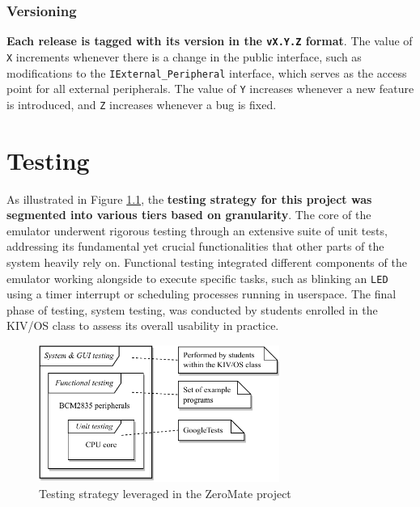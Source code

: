 \documentclass[english, ing, kiv, he, iso690numb, pdf]{fasthesis}
\begin{document}
	\subsection{Versioning}
	
	\textbf{Each release is tagged with its version in the \texttt{v{X}.{Y}.{Z}} format}. The value of \texttt{{X}} increments whenever there is a change in the public interface, such as modifications to the \texttt{IExternal\_Peripheral} interface, which serves as the access point for all external peripherals. The value of \texttt{{Y}} increases whenever a new feature is introduced, and \texttt{{Z}} increases whenever a bug is fixed.
	
	\chapter{Testing}
	
	As illustrated in Figure \ref{Testing strategy leveraged in the ZeroMate project}, the \textbf{testing strategy for this project was segmented into various tiers based on granularity}. The core of the emulator underwent rigorous testing through an extensive suite of unit tests, addressing its fundamental yet crucial functionalities that other parts of the system heavily rely on. Functional testing integrated different components of the emulator working alongside to execute specific tasks, such as blinking an \texttt{LED} using a timer interrupt or scheduling processes running in userspace. The final phase of testing, system testing, was conducted by students enrolled in the KIV/OS class to assess its overall usability in practice.
	
	\begin{figure}[ht]
		\centering
		\includegraphics[width=0.7\textwidth]{img/diagrams/testing.pdf}
		\caption{Testing strategy leveraged in the ZeroMate project}
		\label{Testing strategy leveraged in the ZeroMate project}
	\end{figure}
	
\end{document}
